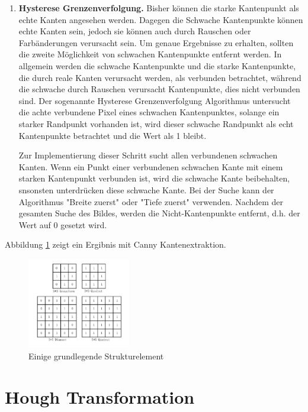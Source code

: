 \begin{enumerate}
	\item \textbf{Hysterese Grenzenverfolgung.} Bisher können die starke Kantenpunkt als echte Kanten angesehen werden. Dagegen die Schwache Kantenpunkte können echte Kanten sein, jedoch sie können auch durch Rauschen oder Farbänderungen verursacht sein. Um genaue Ergebnisse zu erhalten, sollten die zweite Möglichkeit von schwachen Kantenpunkte entfernt werden. In allgemein werden die schwache Kantenpunkte und die starke Kantenpunkte, die durch reale Kanten verursacht werden, als verbunden betrachtet, während die schwache durch Rauschen verursacht Kantenpunkte, dies nicht verbunden sind. Der sogenannte Hysterese Grenzenverfolgung Algorithmus untersucht die achte verbundene Pixel eines schwachen Kantenpunktes, solange ein starker Randpunkt vorhanden ist, wird dieser schwache Randpunkt als echt Kantenpunkte betrachtet und die Wert als 1 bleibt.
	
Zur Implementierung dieser Schritt sucht allen verbundenen schwachen Kanten. Wenn ein Punkt einer verbundenen schwachen Kante mit einem starken Kantenpunkt verbunden ist, wird die schwache Kante beibehalten, snsonsten unterdrücken diese schwache Kante. Bei der Suche kann der Algorithmus "Breite zuerst" oder "Tiefe zuerst" verwenden. Nachdem der gesamten Suche des Bildes, werden die Nicht-Kantenpunkte entfernt, d.h. der Wert auf 0 gesetzt wird.
	
\end{enumerate}

Abbildung \ref{fig:canny} zeigt ein Ergibnis mit Canny Kantenextraktion.

\begin{figure}[H]
 \centering 
  \includegraphics[keepaspectratio,width=0.4\textwidth]{images/4_ZweiteErfahrung/Canny/canny.pdf}
 \caption{Einige grundlegende Strukturelement}
 \label{fig:canny}
\end{figure} 

\section{Hough Transformation}

